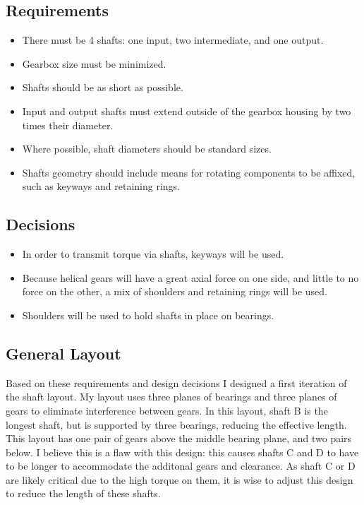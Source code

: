 \documentclass[titlepage]{article} %
\begin{document}
\subsection{Requirements}
\begin{itemize}
    \item There must be 4 shafts: one input, two intermediate, and one output.
    \item Gearbox size must be minimized.
    \item Shafts should be as short as possible.
    \item Input and output shafts must extend outside of the gearbox housing by
    two times their diameter.
    \item Where possible, shaft diameters should be standard sizes.
    \item Shafts geometry should include means for rotating components to be
    affixed, such as keyways and retaining rings.
\end{itemize}

\subsection{Decisions}
\begin{itemize}
    \item In order to transmit torque via shafts, keyways will be used.
    \item Because helical gears will have a great axial force on one side, and
    little to no force on the other, a mix of shoulders and retaining rings will
    be used.
    \item Shoulders will be used to hold shafts in place on bearings.
\end{itemize}

\subsection{General Layout}

Based on these requirements and design decisions I designed a first iteration
of the shaft layout. My layout uses three planes of bearings and three planes of
gears to eliminate interference between gears. In this layout, shaft B is the
longest shaft, but is supported by three bearings, reducing the effective length.
This layout has one pair of gears above the middle bearing plane, and two pairs
below. I believe this is a flaw with this design: this causes shafts C and D to
have to be longer to accommodate the additonal gears and clearance. As shaft C or
D are likely critical due to the high torque on them, it is wise to adjust this
design to reduce the length of these shafts.
\end{document}
